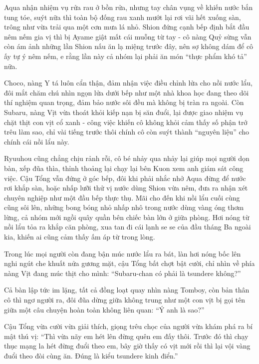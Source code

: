 \documentclass[../main.tex]{subfiles}
\begin{document}
Aqua nhận nhiệm vụ rửa rau ở bồn rửa, nhưng tay chân vụng về khiến nước bắn tung tóe, suýt nữa thì toàn bộ đống rau xanh mướt lại rơi vãi hết xuống sàn, trông như vừa trải qua một cơn mưa lá nhỏ. Shion đứng cạnh bếp định bắt đầu nêm nếm gia vị thì bị Ayame giật mất cái muỗng từ tay - cô nàng Quỷ sừng vẫn còn ám ảnh những lần Shion nấu ăn lạ miệng trước đây, nên sợ không dám để cô ấy tự ý nêm nếm, e rằng lần này cả nhóm lại phải ăn món ``thực phẩm khó tả'' nữa.

Choco, nàng Y tá luôn cẩn thận, đảm nhận việc điều chỉnh lửa cho nồi nước lẩu, đôi mắt chăm chú nhìn ngọn lửa dưới bếp như một nhà khoa học đang theo dõi thí nghiệm quan trọng, đảm bảo nước sôi đều mà không bị tràn ra ngoài. Còn Subaru, nàng Vịt vừa thoát khỏi kiếp nạn bị săn đuổi, lại được giao nhiệm vụ chặt thịt con vịt cổ xanh - công việc khiến cô không khỏi cảm thấy số phận trớ trêu làm sao, chỉ vài tiếng trước thôi chính cô còn suýt thành ``nguyên liệu'' cho chính cái nồi lẩu này.

Ryuuhou cũng chẳng chịu rảnh rỗi, cô bé nhảy qua nhảy lại giúp mọi người dọn bàn, xếp đũa thìa, thỉnh thoảng lại chạy lại bên Kuon xem anh giám sát công việc. Cậu Tổng vẫn đứng ở góc bếp, đôi khi phải nhắc nhở Aqua đừng để nước rơi khắp sàn, hoặc nhấp lưỡi thử vị nước dùng Shion vừa nêm, đưa ra nhận xét chuyên nghiệp như một đầu bếp thực thụ. Mãi cho đến khi nồi lẩu cuối cùng cũng sôi lên, những bong bóng nhỏ nhấp nhô trong nước dùng vàng óng thơm lừng, cả nhóm mới ngồi quây quần bên chiếc bàn lớn ở giữa phòng. Hơi nóng từ nồi lẩu tỏa ra khắp căn phòng, xua tan đi cái lạnh se se của đầu tháng Ba ngoài kia, khiến ai cũng cảm thấy ấm áp từ trong lòng.


Trong lúc mọi người còn đang bận múc nước lẩu ra bát, làn hơi nóng bốc lên nghi ngút che khuất nửa gương mặt, cậu Tổng bất chợt bật cười, chỉ nhìn về phía nàng Vịt đang múc thịt cho mình: ``Subaru-chan có phải là tsundere không?''

Cả bàn lập tức im lặng, tất cả đồng loạt quay nhìn nàng Tomboy, còn bản thân cô thì ngơ người ra, đôi đũa dừng giữa không trung như một con vịt bị gọi tên giữa một câu chuyện hoàn toàn không liên quan: ``Ý anh là sao?''

Cậu Tổng vừa cười vừa giải thích, giọng trêu chọc của người vừa khám phá ra bí mật thú vị: ``Thì vừa nãy em hét lên đừng quên em đấy thôi. Trước đó thì chạy thục mạng la hét đừng đuổi theo em, bây giờ thấy có vịt mới rồi thì lại vội vàng đuổi theo đòi cùng ăn. Đúng là kiểu tsundere kinh điển.''
\end{document}
